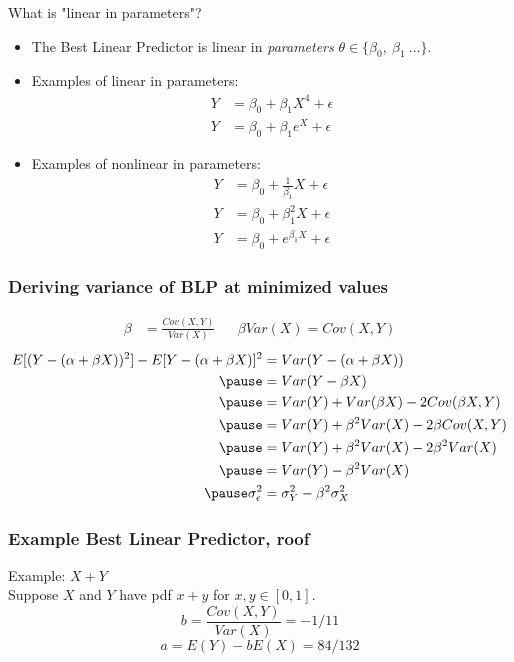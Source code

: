 \documentclass[aspectratio=169, handout]{beamer}
\numberwithin{equation}{section}
\begin{document}
\begin{frame}{What is "linear in parameters"?}
\begin{itemize}
\item The Best Linear Predictor is linear in \emph{parameters} $\theta\in\{\beta_0,\ \beta_1\ \ldots\}$.\pause
\item Examples of linear in parameters: 
\begin{align*}
Y&=\beta_0+\beta_1X^{4}+\epsilon\\
Y&=\beta_0+\beta_1e^{X}+\epsilon
\end{align*}  \pause
\item Examples of nonlinear in parameters:
\begin{align*}
Y&=\beta_0+\frac{1}{\beta_1}X+\epsilon\\
Y&=\beta_0+\beta_1^2 X+\epsilon\\
Y&=\beta_0+e^{\beta_1 X}+\epsilon
\end{align*} 
\end{itemize}

\end{frame}



\begin{frame}
\frametitle{Deriving variance of BLP at minimized values}
\begin{align*}
\beta &=\frac{Cov(X,Y)}{Var(X)}&&  \beta Var(X)=Cov(X,Y)
\end{align*}  \pause
\begin{align*}
E[(Y-(\alpha+\beta X))^2]-E[Y-(\alpha+\beta X)]^2 &=Var(Y-(\alpha+\beta X))\\\pause
&=Var(Y-\beta X)\\\pause
&=Var(Y)+Var(\beta X)-2 Cov(\beta X,Y)\\\pause
 &=Var(Y)+\beta^2Var(X)-2\beta Cov(X,Y)\\\pause
 &=Var(Y)+\beta^2Var(X)-2\beta^2 Var(X)\\\pause
  &=Var(Y)-\beta^2 Var(X)\\\pause
  \sigma^2_\epsilon  &=\sigma^2_Y-\beta^2 \sigma^2_X\\
\end{align*} 
\end{frame}



\begin{frame}
\frametitle{Example Best Linear Predictor, roof}
Example: $X + Y$\\
Suppose $X$ and $Y$ have pdf $x + y$ for $x, y \in [0,1]$.  \pause \\
\pause
$$b=\frac{Cov(X,Y)}{Var(X)} = -1/11$$
$$a=E(Y)-bE(X)= 84/132$$
\end{frame}
\end{document}
